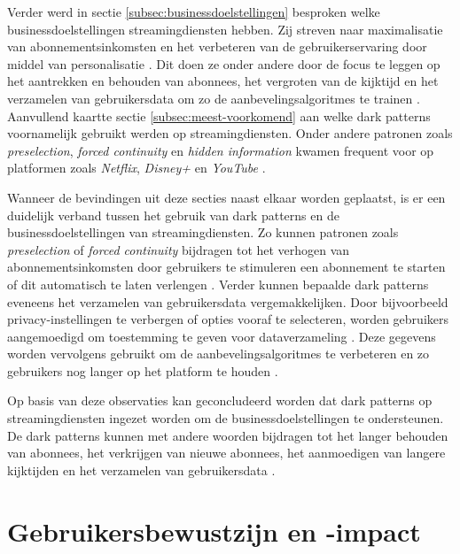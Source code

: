 Verder werd in sectie \ref{subsec:businessdoelstellingen} besproken welke businessdoelstellingen streamingdiensten hebben. Zij streven naar maximalisatie van abonnementsinkomsten en het verbeteren van de gebruikerservaring door middel van personalisatie \autocite{Tang2023}. Dit doen ze onder andere door de focus te leggen op het aantrekken en behouden van abonnees, het vergroten van de kijktijd en het verzamelen van gebruikersdata om zo de aanbevelingsalgoritmes te trainen \autocite{Tang2023}. Aanvullend kaartte sectie \ref{subsec:meest-voorkomend} aan welke dark patterns voornamelijk gebruikt werden op streamingdiensten. Onder andere patronen zoals \textit{preselection}, \textit{forced continuity} en \textit{hidden information} kwamen frequent voor op platformen zoals \textit{Netflix}, \textit{Disney+} en \textit{YouTube} \autocite{Nygren2024, Chaudhary2022}.

\vspace{1em}

Wanneer de bevindingen uit deze secties naast elkaar worden geplaatst, is er een duidelijk verband tussen het gebruik van dark patterns en de businessdoelstellingen van streamingdiensten. Zo kunnen patronen zoals \textit{preselection} of \textit{forced continuity} bijdragen tot het verhogen van abonnementsinkomsten door gebruikers te stimuleren een abonnement te starten of dit automatisch te laten verlengen \autocite{OECD2022}. Verder kunnen bepaalde dark patterns eveneens het verzamelen van gebruikersdata vergemakkelijken. Door bijvoorbeeld privacy-instellingen te verbergen of opties vooraf te selecteren, worden gebruikers aangemoedigd om toestemming te geven voor dataverzameling \autocite{OECD2022}. Deze gegevens worden vervolgens gebruikt om de aanbevelingsalgoritmes te verbeteren en zo gebruikers nog langer op het platform te houden \autocite{Tang2023}.

\vspace{1em}

Op basis van deze observaties kan geconcludeerd worden dat dark patterns op streamingdiensten ingezet worden om de businessdoelstellingen te ondersteunen. De dark patterns kunnen met andere woorden bijdragen tot  het langer behouden van abonnees, het verkrijgen van nieuwe abonnees, het aanmoedigen van langere kijktijden en het verzamelen van gebruikersdata \autocite{OECD2022, Tang2023, Kitkowska2023}.

\newpage

\section{Gebruikersbewustzijn en -impact}
\label{sec:gebruikersbewustzijn}


